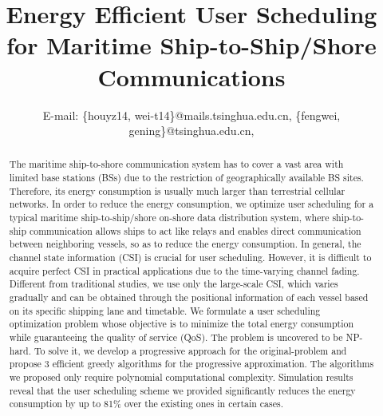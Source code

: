 \documentclass[conference]{IEEEtran}
\begin{document}
\title{Energy Efficient User Scheduling for Maritime Ship-to-Ship/Shore Communications}

\author{
 E-mail: \{houyz14, wei-t14\}@mails.tsinghua.edu.cn, \{fengwei, gening\}@tsinghua.edu.cn, %
}





\maketitle

\begin{abstract}

The maritime ship-to-shore communication system has to cover a vast area with limited base stations (BSs) due to the restriction of geographically available BS sites. Therefore, its energy consumption is usually much larger than terrestrial cellular networks. In order to reduce the energy consumption, we optimize user scheduling for a typical maritime ship-to-ship/shore on-shore data distribution system, where ship-to-ship communication allows ships to act like relays and enables direct communication between neighboring vessels, so as to reduce the energy consumption. 
In general, the channel state information (CSI) is crucial for user scheduling. However, it is difficult to acquire perfect CSI in practical applications due to the time-varying channel fading. Different from traditional studies, we use only the large-scale CSI, which varies gradually and can be obtained through the positional information of each vessel based on its specific shipping lane and timetable. 
We formulate a user scheduling optimization problem whose objective is to minimize the total energy consumption while guaranteeing the quality of service (QoS). The problem is uncovered to be NP-hard. To solve it, we develop a progressive approach for the original-problem and propose 3 efficient greedy algorithms for the progressive approximation. The algorithms we proposed only require polynomial computational complexity. Simulation results reveal that the user scheduling scheme we provided significantly reduces the energy consumption by up to 81\% over the existing ones in certain cases.
\end{abstract}
\end{document}
